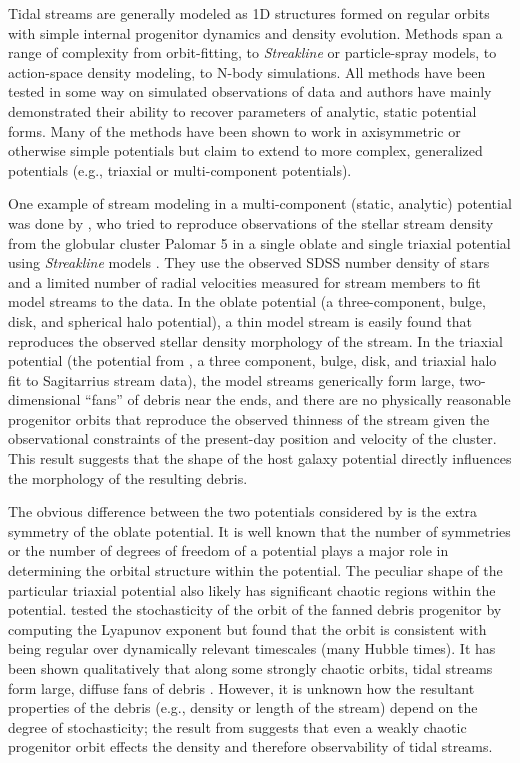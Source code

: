 \documentclass[letterpaper,12pt,preprint]{aastex}
\begin{document}
Tidal streams are generally modeled as 1D structures formed on regular orbits with simple internal progenitor dynamics and density evolution. Methods span a range of complexity from orbit-fitting, to \emph{Streakline} or particle-spray models, to action-space density modeling, to N-body simulations. All methods have been tested in some way on simulated observations of data and authors have mainly demonstrated their ability to recover parameters of analytic, static potential forms. Many of the methods have been shown to work in axisymmetric or otherwise simple potentials but claim to extend to more complex, generalized potentials (e.g., triaxial or multi-component potentials). 

One example of stream modeling in a multi-component (static, analytic) potential was done by \citet{pearson15}, who tried to reproduce observations of the stellar stream density from the globular cluster Palomar 5 in a single oblate and single triaxial potential using \emph{Streakline} models \citep{kuepper12}. They use the observed SDSS number density of stars and a limited number of radial velocities measured for stream members to fit model streams to the data. In the oblate potential (a three-component, bulge, disk, and spherical halo potential), a thin model stream is easily found that reproduces the observed stellar density morphology of the stream. In the triaxial potential (the potential from \cite{law10}, a three component, bulge, disk, and triaxial halo fit to Sagitarrius stream data), the model streams generically form large, two-dimensional ``fans'' of debris near the ends, and there are no physically reasonable progenitor orbits that reproduce the observed thinness of the stream given the observational constraints of the present-day position and velocity of the cluster. This result suggests that the shape of the host galaxy potential directly influences the morphology of the resulting debris. %

The obvious difference between the two potentials considered by \citet{pearson15} is the extra symmetry of the oblate potential. It is well known that the number of symmetries or the number of degrees of freedom of a potential plays a major role in determining the orbital structure within the potential. The peculiar shape of the particular triaxial potential also likely has significant chaotic regions within the potential. \citet{pearson15} tested the stochasticity of the orbit of the fanned debris progenitor by computing the Lyapunov exponent but found that the orbit is consistent with being regular over dynamically relevant timescales (many Hubble times). It has been shown qualitatively that along some strongly chaotic orbits, tidal streams form large, diffuse fans of debris \citep[e.g.,][]{fardal14}. However, it is unknown how the resultant properties of the debris (e.g., density or length of the stream) depend on the degree of stochasticity; the result from \citet{pearson15} suggests that even a weakly chaotic progenitor orbit effects the density and therefore observability of tidal streams. 
\end{document}
